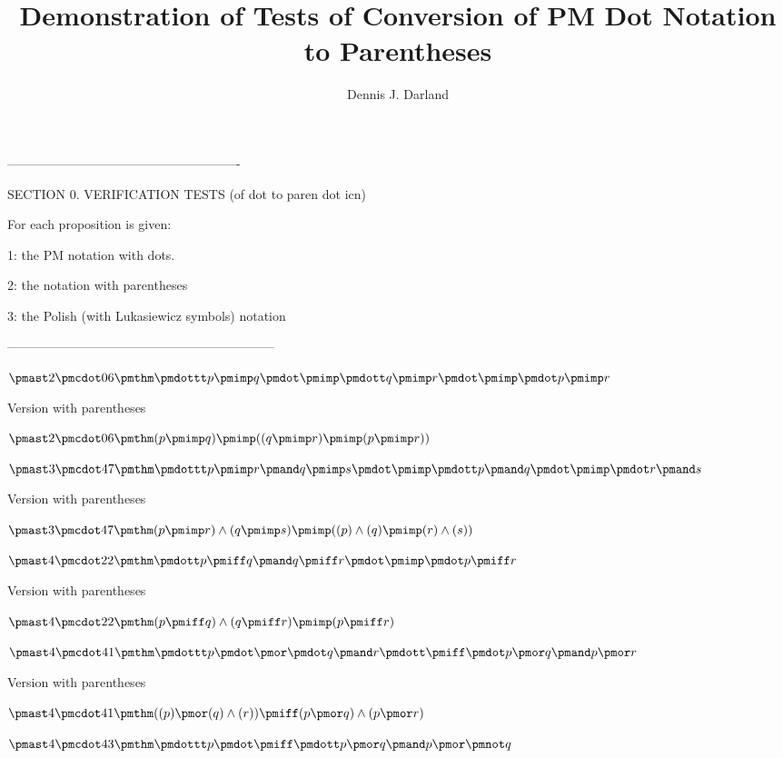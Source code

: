\documentclass[12pt]{article}
\title{Demonstration of Tests of Conversion of PM Dot Notation to Parentheses}
\author{Dennis J. Darland}
\begin{document}
\maketitle
-------------------------------------------------------

SECTION 0. VERIFICATION TESTS (of dot to paren dot icn)

For each proposition is given:

1: the PM notation with dots.

2: the notation with parentheses 

3: the Polish (with Lukasiewicz symbols) notation

---------------------------------------------------------------

$\pmast 2 \pmcdot 06 \pmthm \pmdottt p \pmimp q \pmdot \pmimp \pmdott q \pmimp r \pmdot \pmimp \pmdot p \pmimp r $
 
 

Version with parentheses

$\pmast 2 \pmcdot 06 \pmthm  (  p \pmimp q  ) \pmimp ((  q \pmimp r  ) \pmimp (  p \pmimp r ))$


$\pmast 3 \pmcdot 47 \pmthm \pmdottt p \pmimp r \pmand q \pmimp s \pmdot \pmimp \pmdott p \pmand q \pmdot \pmimp \pmdot r \pmand s $
 
 

Version with parentheses

$\pmast 3 \pmcdot 47 \pmthm  (  p \pmimp r ) \land ( q \pmimp s  ) \pmimp ((  p ) \land ( q  ) \pmimp (  r ) \land ( s ))$


$\pmast 4 \pmcdot 22 \pmthm \pmdott p \pmiff q \pmand q \pmiff r \pmdot \pmimp \pmdot p \pmiff r$
 
 

Version with parentheses

$\pmast 4 \pmcdot 22 \pmthm  (  p \pmiff q ) \land ( q \pmiff r  ) \pmimp (  p \pmiff r)$


$\pmast 4 \pmcdot 41 \pmthm \pmdottt p \pmdot \pmor \pmdot q \pmand r \pmdott \pmiff \pmdot p \pmor q \pmand p \pmor r$
 
 

Version with parentheses

$\pmast 4 \pmcdot 41 \pmthm  ((  p  ) \pmor (  q ) \land ( r  )) \pmiff (  p \pmor q ) \land ( p \pmor r)$


$\pmast 4 \pmcdot 43 \pmthm \pmdottt p \pmdot \pmiff \pmdott p \pmor q \pmand p \pmor \pmnot q$
 
 
\end{document}
